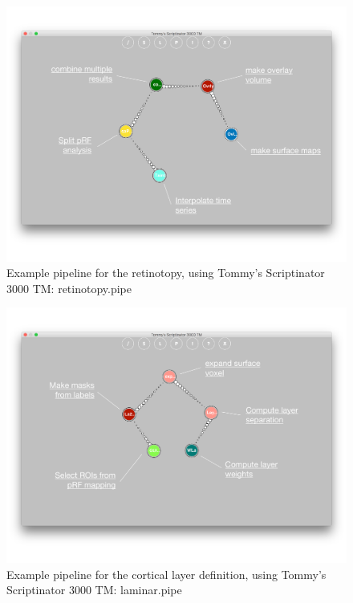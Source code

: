 \documentclass[12pt,a4paper]{scrartcl}
\begin{document}
\begin{figure}[h]
\begin{center}
\includegraphics[width=\textwidth]{retino-pipe}
\caption[Retinotopy Pipeline]{Example pipeline for the retinotopy, using Tommy's Scriptinator 3000 TM: retinotopy.pipe}
\end{center}
\end{figure}

\begin{figure}[h]
\begin{center}
\includegraphics[width=\textwidth]{laminar-pipe}
\caption[Laminar definition Pipeline]{Example pipeline for the cortical layer definition, using Tommy's Scriptinator 3000 TM: laminar.pipe}
\end{center}
\end{figure}
\end{document}
